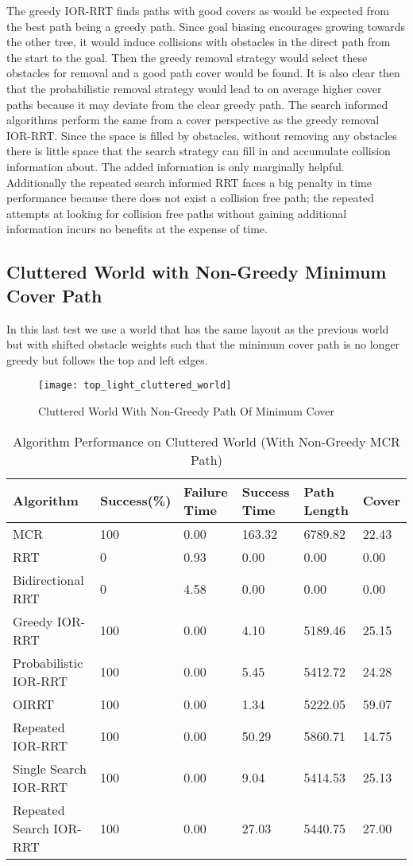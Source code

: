 The greedy IOR-RRT finds paths with good covers as would be expected from the best path being a greedy path. Since goal biasing encourages growing towards the other tree, it would induce collisions with obstacles in the direct path from the start to the goal. Then the greedy removal strategy would select these obstacles for removal and a good path cover would be found. It is also clear then that the probabilistic removal strategy would lead to on average higher cover paths because it may deviate from the clear greedy path. The search informed algorithms perform the same from a cover perspective as the greedy removal IOR-RRT. Since the space is filled by obstacles, without removing any obstacles there is little space that the search strategy can fill in and accumulate collision information about. The added information is only marginally helpful. Additionally the repeated search informed RRT faces a big penalty in time performance because there does not exist a collision free path; the repeated attempts at looking for collision free paths without gaining additional information incurs no benefits at the expense of time.


\subsection{Cluttered World with Non-Greedy Minimum Cover Path}
In this last test we use a world that has the same layout as the previous world but with shifted obstacle weights such that the minimum cover path is no longer greedy but follows the top and left edges. 

\begin{figure}[h!]
    \centering
    \texttt{[image: top\_light\_cluttered\_world]}
    \caption{Cluttered World With Non-Greedy Path Of Minimum Cover}
    \label{fig:top_light_cluttered_world}
\end{figure}

\begin{table}[h!]
\begin{tabular}{@{}llllll@{}}
\toprule
Algorithm & Success(\%)  & Failure Time  & Success Time  & Path Length & Cover\\ 
\midrule
MCR & 100 & 0.00 & 163.32 & 6789.82 & 22.43 \\
RRT & 0 & 0.93 & 0.00 & 0.00 & 0.00 \\
Bidirectional RRT & 0 & 4.58 & 0.00 & 0.00 & 0.00 \\
Greedy IOR-RRT & 100 & 0.00 & 4.10 & 5189.46 & 25.15 \\
Probabilistic IOR-RRT & 100 & 0.00 & 5.45 & 5412.72 & 24.28 \\
OIRRT & 100 & 0.00 & 1.34 & 5222.05 & 59.07 \\
Repeated IOR-RRT & 100 & 0.00 & 50.29 & 5860.71 & 14.75 \\
Single Search IOR-RRT & 100 & 0.00 & 9.04 & 5414.53 & 25.13 \\
Repeated Search IOR-RRT & 100 & 0.00 & 27.03 & 5440.75 & 27.00 \\
\bottomrule
\end{tabular}
\caption{Algorithm Performance on Cluttered World (With Non-Greedy MCR Path)}
\label{tab:top_light_cluttered_world}
\end{table}

